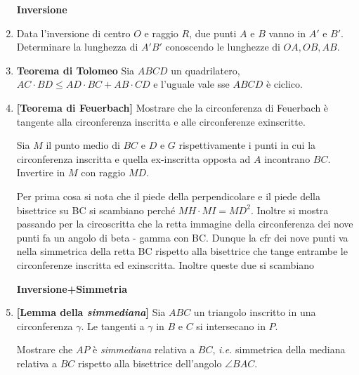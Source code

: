 \begin{enumerate}
       
       \textbf{Inversione}
       \item Data l'inversione di centro $O$ e raggio $R$, due punti $A$ e $B$ vanno in $A'$ e $B'$. Determinare la lunghezza di $A'B'$ conoscendo le lunghezze di $OA,OB,AB$.

       
       \item \textbf{Teorema di Tolomeo} Sia $ABCD$ un quadrilatero, $AC\cdot BD\leq AD\cdot BC + AB\cdot CD$ e l'uguale vale sse $ABCD$ è ciclico.
       
       
       	 \item \textbf{[Teorema di Feuerbach]} Mostrare che la circonferenza di Feuerbach è tangente alla circonferenza inscritta e alle circonferenze exinscritte.
    
    \begin{sol} Sia $M$ il punto medio di $BC$ e $D$ e $G$ rispettivamente i punti in cui la circonferenza inscritta e quella ex-inscritta opposta ad $A$ incontrano $BC$. Invertire in $M$ con raggio $MD$.

    Per prima cosa si nota che il piede della perpendicolare e il piede della bisettrice su BC si scambiano perché $MH\cdot MI=MD^2$. Inoltre si mostra passando per la circoscritta che la retta immagine della circonferenza dei nove punti fa un angolo di beta - gamma con BC. Dunque la cfr dei nove punti va nella simmetrica della retta BC rispetto alla bisettrice che tange entrambe le circonferenze inscritta ed exinscritta. Inoltre queste due si scambiano
    \end{sol}
       
       \textbf{Inversione+Simmetria}
      
    
	 \item  \textbf{[Lemma della \textit{simmediana}]} Sia $ABC$ un triangolo inscritto in una circonferenza $\gamma$. Le tangenti a $\gamma$ in $B$ e $C$ si intersecano in $P$.
    
     Mostrare che $AP$ è \textit{simmediana} relativa a $BC$, \textit{i.e.} simmetrica della mediana relativa a $BC$ rispetto alla bisettrice dell'angolo $\angle BAC$.    
    

	

 \end{enumerate}


